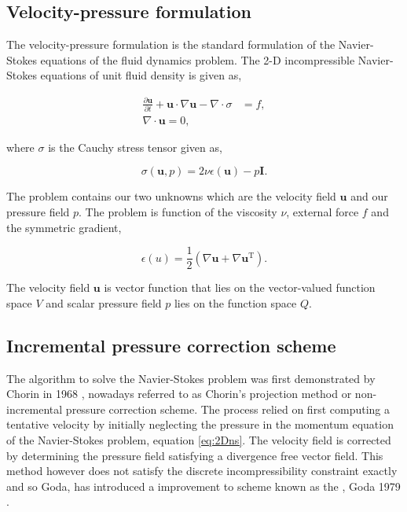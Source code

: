 \subsection{Velocity-pressure formulation}
The velocity-pressure formulation is the standard formulation of the Navier-Stokes equations of the fluid dynamics problem. The 2-D incompressible Navier-Stokes equations of unit fluid density is given as,

	\begin{subequations}
	\begin{align}
	\frac{\partial \mathbf{u}}{\partial t} + \mathbf{u}\cdot\nabla\mathbf{u} - \nabla \cdot \sigma &= f,\\
	\nabla \cdot \mathbf{u} = 0,
	\end{align}	
	\label{eq:2Dns}
	\end{subequations}

where $\sigma$ is the Cauchy stress tensor given as,

	\begin{equation}
	\sigma(\mathbf{u},p) = 2\nu\epsilon(\mathbf{u}) - p\mathbf{I}.
	\end{equation}

The problem contains our two unknowns which are the velocity field $\mathbf{u}$ and our pressure field $p$. The problem is function of the viscosity $\nu$, external force $f$ and the symmetric gradient,

	\begin{equation}
	\epsilon(u) = \frac{1}{2} \left(\nabla \mathbf{u} + \nabla \mathbf{u}^{\mathrm{T}}\right).
	\label{eq:symGrad}
	\end{equation}

The velocity field $\mathbf{u}$ is vector function that lies on the vector-valued function space $V$ and scalar pressure field $p$ lies on the function space $Q$.

\subsection{Incremental pressure correction scheme}

The algorithm to solve the Navier-Stokes problem was first demonstrated by Chorin in 1968 \cite{Chorin1968}, nowadays referred to as Chorin's projection method or non-incremental pressure correction scheme. The process relied on first computing a tentative velocity by initially neglecting the pressure in the momentum equation of the Navier-Stokes problem, equation \ref{eq:2Dns}. The velocity field is corrected by determining the pressure field satisfying a divergence free vector field. This method however does not satisfy the discrete incompressibility constraint exactly and so Goda, has introduced a improvement to scheme known as the , Goda 1979 \cite{Goda1979a}.

